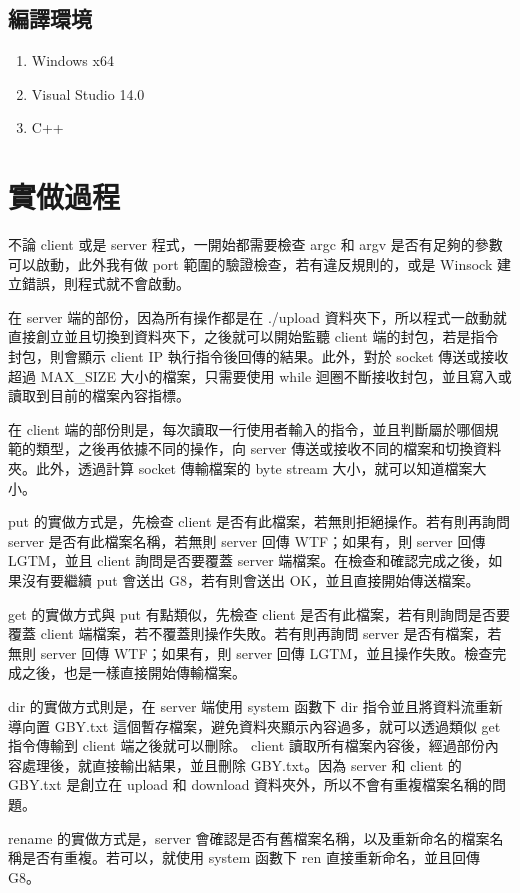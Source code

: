 \documentclass[a4paper]{article}
\begin{document}
\begin{CJK}{UTF8}{bsmi}
\subsection{編譯環境}
\begin{enumerate}
\item Windows x64
\item Visual Studio 14.0
\item C++
\end{enumerate}

\section{實做過程}
不論 client 或是 server 程式，一開始都需要檢查 argc 和 argv 是否有足夠的參數可以啟動，此外我有做 port 範圍的驗證檢查，若有違反規則的，或是 Winsock 建立錯誤，則程式就不會啟動。

在 server 端的部份，因為所有操作都是在 ./upload 資料夾下，所以程式一啟動就直接創立並且切換到資料夾下，之後就可以開始監聽 client 端的封包，若是指令封包，則會顯示 client IP 執行指令後回傳的結果。此外，對於 socket 傳送或接收超過 MAX\_SIZE 大小的檔案，只需要使用 while 迴圈不斷接收封包，並且寫入或讀取到目前的檔案內容指標。

在 client 端的部份則是，每次讀取一行使用者輸入的指令，並且判斷屬於哪個規範的類型，之後再依據不同的操作，向 server 傳送或接收不同的檔案和切換資料夾。此外，透過計算 socket 傳輸檔案的 byte stream 大小，就可以知道檔案大小。

put 的實做方式是，先檢查 client 是否有此檔案，若無則拒絕操作。若有則再詢問 server 是否有此檔案名稱，若無則 server 回傳 WTF；如果有，則 server 回傳 LGTM，並且 client 詢問是否要覆蓋 server 端檔案。在檢查和確認完成之後，如果沒有要繼續 put 會送出 G8，若有則會送出 OK，並且直接開始傳送檔案。

get 的實做方式與 put 有點類似，先檢查 client 是否有此檔案，若有則詢問是否要覆蓋 client 端檔案，若不覆蓋則操作失敗。若有則再詢問 server 是否有檔案，若無則 server 回傳 WTF；如果有，則 server 回傳 LGTM，並且操作失敗。檢查完成之後，也是一樣直接開始傳輸檔案。

dir 的實做方式則是，在 server 端使用 system 函數下 dir 指令並且將資料流重新導向置 GBY.txt 這個暫存檔案，避免資料夾顯示內容過多，就可以透過類似 get 指令傳輸到 client  端之後就可以刪除。 client 讀取所有檔案內容後，經過部份內容處理後，就直接輸出結果，並且刪除 GBY.txt。因為 server 和 client 的 GBY.txt 是創立在 upload 和 download 資料夾外，所以不會有重複檔案名稱的問題。

rename 的實做方式是，server 會確認是否有舊檔案名稱，以及重新命名的檔案名稱是否有重複。若可以，就使用 system 函數下 ren 直接重新命名，並且回傳 G8。


\end{CJK}
\end{document}
